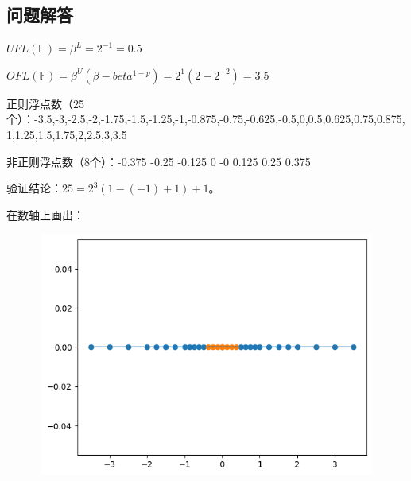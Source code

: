 \documentclass{ctexart}
\begin{document}
\subsection{问题解答}

$UFL(\mathbb{F})=\beta^L=2^{-1}=0.5$

$OFL(\mathbb{F})=\beta^U(\beta-beta^{1-p})=2^1(2-2^{-2})=3.5$

正则浮点数（25个）：-3.5,-3,-2.5,-2,-1.75,-1.5,-1.25,-1,-0.875,-0.75,-0.625,-0.5,0,0.5,0.625,0.75,0.875,1,1.25,1.5,1.75,2,2.5,3,3.5

非正则浮点数（8个）：-0.375 -0.25 -0.125 0 -0 0.125 0.25 0.375

验证结论：$25=2^3(1-(-1)+1)+1$。

在数轴上画出：

\begin{figure}[h]
    \begin{minipage}{4cm}
	\includegraphics[width = 12cm, height = 8cm]{B.png}
	\label{fig1}
	\end{minipage}
\end{figure}
\end{document}
